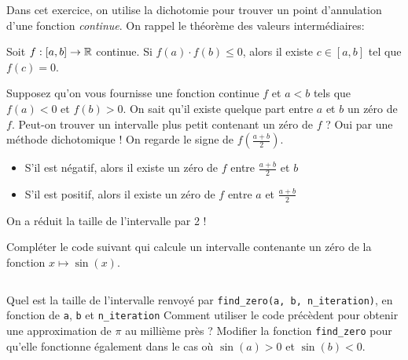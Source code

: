\begin{enonce}
	Dans cet exercice, on utilise la dichotomie pour trouver un point d'annulation d'une fonction \emph{continue}. On rappel le théorème des valeurs intermédiaires:
	\begin{theorem}
		Soit $ f: [a,b] \rightarrow \mathbb{R} $ continue. Si $ f(a) \cdot f(b) \leq 0 $, alors il existe $ c \in [a, b] $ tel que $ f(c) = 0 $.
	\end{theorem}
	Supposez qu'on vous fournisse une fonction continue $ f $ et $ a < b $ tels que $ f(a)<0$ et $ f(b) > 0 $. On sait qu'il existe quelque part entre $ a $ et $ b $ un zéro de $ f $. Peut-on trouver un intervalle plus petit contenant un zéro de $ f $ ? Oui par une méthode dichotomique ! On regarde le signe de $ f(\frac{a+b}{2}) $.
	\begin{itemize}
		\item S'il est négatif, alors il existe un zéro de $ f $ entre $ \frac{a+b}{2} $ et $ b $
		\item S'il est positif, alors il existe un zéro de $ f $ entre $ a $ et $ \frac{a+b}{2} $
	\end{itemize}
	On a réduit la taille de l'intervalle par 2 !

	\quessques Compléter le code suivant qui calcule un intervalle contenante un zéro de la fonction $ x \mapsto \sin(x) $.
	\inputminted{python}{minted/9/find_zero.py}
	\ssques Quel est la taille de l'intervalle renvoyé par \texttt{find\_zero(a, b, n\_iteration)}, en fonction de \texttt{a}, \texttt{b} et \texttt{n\_iteration}
	\ssques Comment utiliser le code précèdent pour obtenir une approximation de $ \pi $ au millième près ?
	\ques Modifier la fonction  \texttt{find\_zero} pour qu'elle fonctionne également dans le cas où $ \sin(a) > 0 $ et $ \sin(b) < 0$.
\end{enonce}
